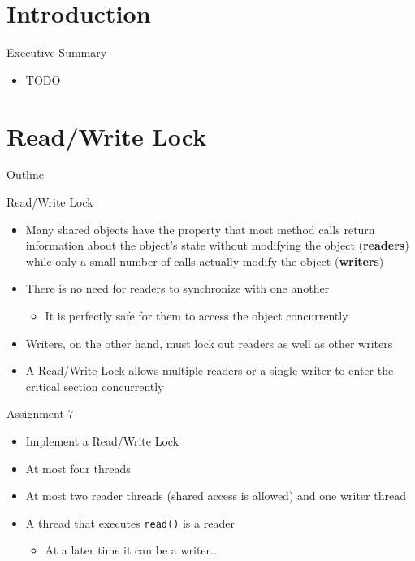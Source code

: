\section*{Introduction}

\begin{frame}{Executive Summary}
  \begin{itemize}
  \item TODO
  \end{itemize}
\end{frame}


\section{Read/Write Lock}

\begin{frame}{Outline}
  \tableofcontents[current]
\end{frame}

\begin{frame}{Read/Write Lock}
  \begin{itemize}
  \item Many shared objects have the property that most method calls
    return information about the object's state without modifying the
    object ({\bf readers}) while only a small number of calls actually
    modify the object ({\bf writers})
  \item There is no need for readers to synchronize with one another
    \begin{itemize}
    \item It is perfectly safe for them to access the object
      concurrently
    \end{itemize}
  \item Writers, on the other hand, must lock out readers as well as
    other writers
  \item A Read/Write Lock allows multiple readers or a single
    writer to enter the critical section concurrently
  \end{itemize}
\end{frame}

\begin{frame}{Assignment 7}
  \begin{itemize}
  \item Implement a Read/Write Lock
  \item At most four threads
  \item At most two reader threads (shared access is allowed) and one
    writer thread
  \item A thread that executes \lstinline!read()! is a reader
    \begin{itemize}
    \item At a later time it can be a writer...
    \end{itemize}
  \end{itemize}
\end{frame}

